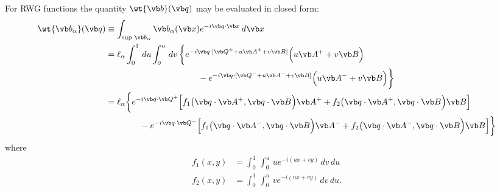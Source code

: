 \documentclass[letterpaper]{article}
\begin{document}
For RWG functions the quantity $\wt{\vb b}(\vb q)$
may be evaluated in closed form:
\begin{align*}
\wt{\vb b_\alpha}(\vb q)
&\equiv
\int_{\text{sup } \vb b_\alpha}
  \vb b_\alpha(\vb x)e^{-i\vb q \cdot \vb x} \, d\vb x
\\
&=\ell_\alpha
  \int_0^1 \, du \int_0^u \, dv \,
  \bigg\{
  e^{-i\vb q\cdot [\vb Q^+ + u \vb A^+ + v\vb B]}
  \Big(u\vb A^+ + v\vb B\Big)
\\ 
  &\hspace{1.5in}
  - 
  e^{-i\vb q\cdot [\vb Q^- + u \vb A^- + v\vb B]}
  \Big(u\vb A^- + v\vb B\Big)
  \bigg\}
\\
&=\ell_\alpha\bigg\{ 
  e^{-i\vb q \cdot \vb Q^+} 
  \Big[ f_1\big(\vb q\cdot \vb A^+, \vb q\cdot \vb B\Big) 
           \vb A^+
       +f_2\big(\vb q\cdot \vb A^+, \vb q\cdot \vb B\Big)
           \vb B
  \Big]
\\
&\qquad\qquad
  -
  e^{-i\vb q \cdot \vb Q^-} 
  \Big[ f_1\big(\vb q\cdot \vb A^-, \vb q\cdot \vb B\Big)
           \vb A^-
       +f_2\big(\vb q\cdot \vb A^-, \vb q\cdot \vb B\Big)
           \vb B
  \Big]\bigg\}
\end{align*}
where
\begin{align*}
 f_1(x, y)&=\int_0^1 \, \int_0^u \, u e^{-i (ux + vy)} \,dv\,du  
\\
 f_2(x, y)&=\int_0^1 \, \int_0^u \, v e^{-i (ux + vy)} \,dv\,du.
\end{align*}
\end{document}

